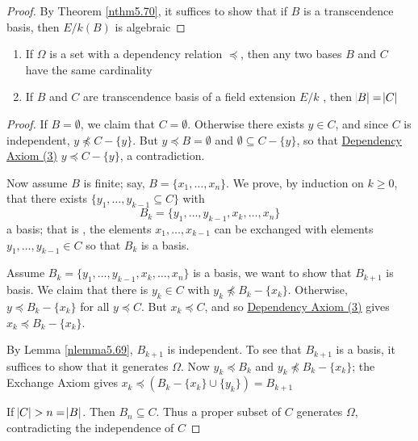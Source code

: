 \documentclass[11pt]{article}
\begin{document}
\begin{proof}
By Theorem \ref{nthm5.70}, it suffices to show that if \(B\) is a transcendence
basis, then \(E/k(B)\) is algebraic
\end{proof}

\begin{theorem}[]
\begin{enumerate}
\item If \(\Omega\) is a set with a dependency relation \(\preceq\), then any two bases
\(B\) and \(C\) have the same cardinality
\item If \(B\) and \(C\) are transcendence basis of a field extension \(E/k\) , then 
\(\abs{B}=\abs{C}\)
\end{enumerate}
\end{theorem}

\begin{proof}
If \(B=\emptyset\), we claim that \(C=\emptyset\). Otherwise there exists
\(y\in C\), and since \(C\) is independent, \(y\not\preceq C-\{y\}\). But
\(y\preceq B=\emptyset\) and \(\emptyset\subseteq C-\{y\}\), so that 
\uline{Dependency Axiom (3)} \(y\preceq C-\{y\}\), a contradiction.

Now assume \(B\) is finite; say, \(B=\{x_1,\dots,x_n\}\). We prove, by
induction on \(k\ge0\), that there exists 
\(\{y_1,\dots,y_{k-1}\subseteq C\}\) with
\begin{equation*}
B_k=\{y_1,\dots,y_{k-1},x_k,\dots,x_n\}
\end{equation*}
a basis; that is , the elements \(x_1,\dots,x_{k-1}\) can be exchanged with
elements \(y_1,\dots,y_{k-1}\in C\) so that \(B_k\) is a basis.

Assume \(B_k=\{y_1,\dots,y_{k-1},x_k,\dots,x_n\}\) is a basis, we want to
show that \(B_{k+1}\) is basis. We claim that there is \(y_k\in C\) with 
\(y_k\not\preceq B_k-\{x_k\}\). Otherwise, \(y\preceq B_k-\{x_k\}\) for all 
\(y\preceq C\). But \(x_k\preceq C\), and so \uline{Dependency Axiom (3)} gives 
\(x_k\preceq B_k-\{x_k\}\).

By Lemma \ref{nlemma5.69}, \(B_{k+1}\) is independent. To see that \(B_{k+1}\)
is a basis, it suffices to show that it generates \(\Omega\). Now 
\(y_k\preceq B_k\) and \(y_k\not\preceq B_k-\{x_k\}\); the Exchange Axiom
gives
\(x_k\preceq (B_k-\{x_k\}\cup\{y_k\})=B_{k+1}\)

If \(\abs{C}>n=\abs{B}\). Then \(B_n\subseteq C\). Thus a proper subset of
\(C\) generates \(\Omega\), contradicting the independence of \(C\)
\end{proof}
\end{document}
